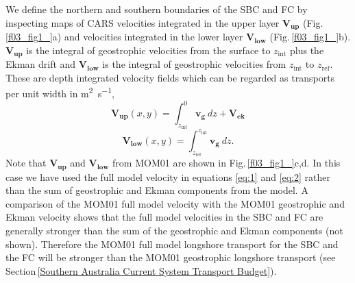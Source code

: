 \documentclass[preprint,3p,review,12pt]{elsarticle}
\renewcommand{\Vec}[1]{\mathbf{#1}}
\newcommand{\sub}[1]{_{\text{#1}}}
\begin{document}
We define the northern and southern boundaries of the SBC and FC by inspecting maps of CARS velocities integrated in the upper layer $\Vec{V\sub{up}}$ (Fig.\,\ref{f03_fig1_}a) and velocities integrated in the lower layer $\Vec{V\sub{low}}$ (Fig.\,\ref{f03_fig1_}b). $\Vec{V\sub{up}}$ is the integral of geostrophic velocities from the surface to $z\sub{int}$ plus the Ekman drift and $\Vec{V\sub{low}}$ is the integral of geostrophic velocities from $z\sub{int}$ to $z\sub{ref}$. These are depth integrated velocity fields which can be regarded as transports per unit width in \si{\square\meter\per\second},
%
\begin{equation} \label{eq:1}
\Vec{V\sub{up}}(x,y) = \int_{z\sub{int}}^{0}\Vec{v\sub{g}}\ dz + \Vec{V\sub{ek}}
\end{equation}
%
\begin{equation} \label{eq:2}
\Vec{V\sub{low}}(x,y) = \int_{z\sub{ref}}^{z\sub{int}}\Vec{v\sub{g}}\ dz.
\end{equation}
%
Note that $\Vec{V\sub{up}}$ and $\Vec{V\sub{low}}$ from MOM01 are shown in Fig.\,\ref{f03_fig1_}c,d. In this case we have used the full model velocity in equations \ref{eq:1} and \ref{eq:2} rather than the sum of geostrophic and Ekman components from the model. A comparison of the MOM01 full model velocity with the MOM01 geostrophic and Ekman velocity shows that the full model velocities in the SBC and FC are generally stronger than the sum of the geostrophic and Ekman components (not shown). Therefore the MOM01 full model longshore transport for the SBC and the FC will be stronger than the MOM01 geostrophic longshore transport (see Section\,\ref{Southern Australia Current System Transport Budget}).
%
\end{document}
